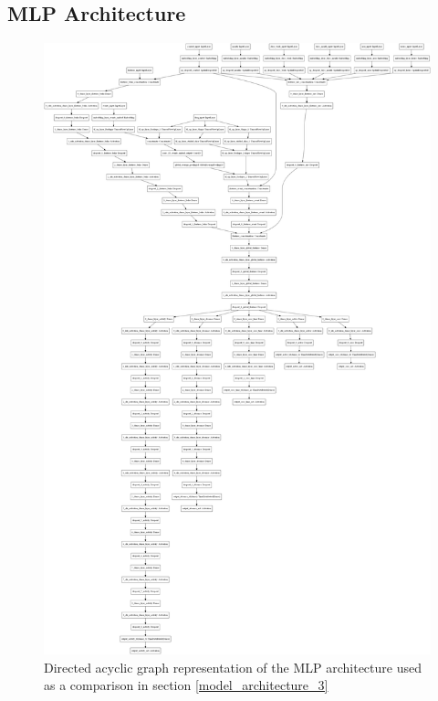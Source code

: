 \subsection{MLP Architecture}
\begin{figure}[H]
\centering
\includegraphics[width=\textwidth,height=0.7\textheight,keepaspectratio]{images/appendix_B/mlp_3.png}
\caption[\textbf{MLP DAG - Section \ref{model_architecture_3}}]{Directed acyclic graph representation of the MLP architecture used as a comparison in section \ref{model_architecture_3}}
\label{mlp_3_dag}
\end{figure}


